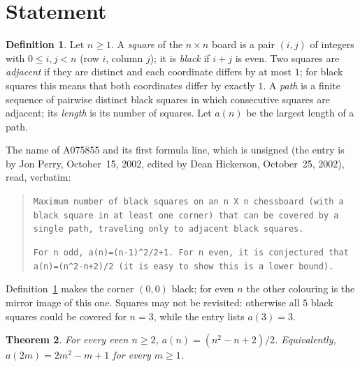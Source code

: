 \documentclass[11pt]{amsart}
\theoremstyle{plain}
\newtheorem{theorem}{Theorem}
\theoremstyle{definition}
\newtheorem{definition}[theorem]{Definition}
\begin{document}
\section{Statement}\label{sec:statement}

\begin{definition}\label{def:board}
Let $n\ge1$. A \emph{square} of the $n\times n$ board is a pair $(i,j)$ of integers with $0\le i,j<n$ (row $i$, column $j$); it is \emph{black} if $i+j$ is even. Two squares are \emph{adjacent} if they are distinct and each coordinate differs by at most $1$; for black squares this means that both coordinates differ by exactly $1$. A \emph{path} is a finite sequence of pairwise distinct black squares in which consecutive squares are adjacent; its \emph{length} is its number of squares. Let $a(n)$ be the largest length of a path.
\end{definition}

The name of A075855 \cite{A075855} and its first formula line, which is unsigned (the entry is by Jon Perry, October~15, 2002, edited by Dean Hickerson, October~25, 2002), read, verbatim:
\begin{quote}
{\small\raggedright\texttt{Maximum number of black squares on an n X n chessboard (with a black square in at least one corner) that can be covered by a single path, traveling only to adjacent black squares.}\par
\texttt{For n odd, a(n)=(n-1)\^{}2/2+1. For n even, it is conjectured that a(n)=(n\^{}2-n+2)/2 (it is easy to show this is a lower bound).}\par}
\end{quote}
Definition~\ref{def:board} makes the corner $(0,0)$ black; for even $n$ the other colouring is the mirror image of this one. Squares may not be revisited: otherwise all $5$ black squares could be covered for $n=3$, while the entry lists $a(3)=3$.

\begin{theorem}\label{thm:main}
For every even $n\ge2$, $a(n)=(n^2-n+2)/2$. Equivalently, $a(2m)=2m^2-m+1$ for every $m\ge1$.
\end{theorem}
\end{document}
